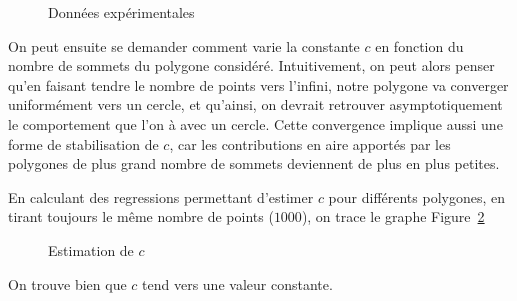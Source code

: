 \documentclass[a4paper,12pt,twoside]{article}
\begin{document}
		\begin{figure}[htpb]
			\centering
			
			\caption{Données expérimentales}
			\label{fig:exp_poly}
		\end{figure}

		On peut ensuite se demander comment varie la constante $c$ en fonction du nombre de sommets du polygone considéré. Intuitivement, on peut alors penser qu'en faisant tendre le nombre de points vers l'infini, notre polygone va converger uniformément vers un cercle, et qu'ainsi, on devrait retrouver asymptotiquement le comportement que l'on à avec un cercle. Cette convergence implique aussi une forme de stabilisation de $c$, car les contributions en aire apportés par les polygones de plus grand nombre de sommets deviennent de plus en plus petites.

		En calculant des regressions permettant d'estimer $c$ pour différents polygones, en tirant toujours le même nombre de points ($1000$), on trace le graphe Figure~\ref{fig:exp_c}

		\begin{figure}[htpb]
			\centering
			
			\caption{Estimation de $c$}
			\label{fig:exp_c}
		\end{figure}

		On trouve bien que $c$ tend vers une valeur constante.
\end{document}
